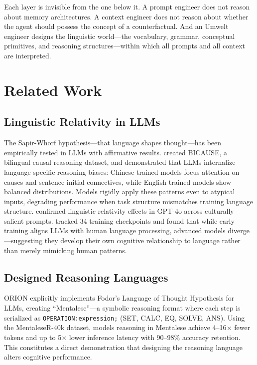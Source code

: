 \documentclass[11pt,a4paper]{article}
\begin{document}
Each layer is invisible from the one below it. A prompt engineer does not reason about memory architectures. A context engineer does not reason about whether the agent should possess the concept of a counterfactual. And an Umwelt engineer designs the linguistic world---the vocabulary, grammar, conceptual primitives, and reasoning structures---within which all prompts and all context are interpreted.

\section{Related Work}

\subsection{Linguistic Relativity in LLMs}

The Sapir-Whorf hypothesis---that language shapes thought---has been empirically tested in LLMs with affirmative results. \citet{wang2025} created BICAUSE, a bilingual causal reasoning dataset, and demonstrated that LLMs internalize language-specific reasoning biases: Chinese-trained models focus attention on causes and sentence-initial connectives, while English-trained models show balanced distributions. Models rigidly apply these patterns even to atypical inputs, degrading performance when task structure mismatches training language structure. \citet{ray2025} confirmed linguistic relativity effects in GPT-4o across culturally salient prompts. \citet{alkhamissi2025} tracked 34 training checkpoints and found that while early training aligns LLMs with human language processing, advanced models diverge---suggesting they develop their own cognitive relationship to language rather than merely mimicking human patterns.

\subsection{Designed Reasoning Languages}

ORION \citep{tanmay2025} explicitly implements Fodor's Language of Thought Hypothesis for LLMs, creating ``Mentalese''---a symbolic reasoning format where each step is serialized as \texttt{OPERATION:expression;} (SET, CALC, EQ, SOLVE, ANS). Using the MentaleseR-40k dataset, models reasoning in Mentalese achieve 4--16$\times$ fewer tokens and up to 5$\times$ lower inference latency with 90--98\% accuracy retention. This constitutes a direct demonstration that designing the reasoning language alters cognitive performance.
\end{document}
